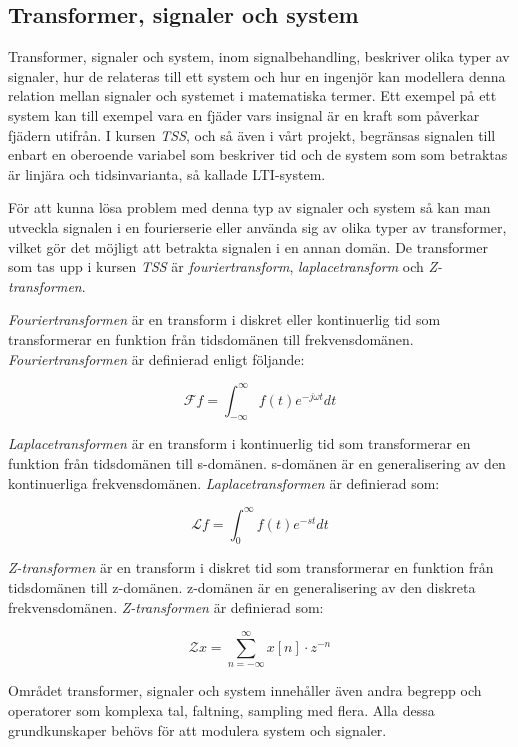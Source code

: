 \documentclass[]{article}
\begin{document}
\subsection{Transformer, signaler och system}
Transformer, signaler och system, inom signalbehandling, beskriver olika typer av signaler, hur de relateras till ett
system och hur en ingenjör kan modellera denna relation mellan signaler och systemet i matematiska termer. Ett exempel
på ett system kan till exempel vara en fjäder vars insignal är en kraft som påverkar fjädern utifrån. I kursen
\textit{TSS}, och så även i vårt projekt, begränsas signalen till enbart en oberoende variabel som beskriver tid och de
system som som betraktas är linjära och tidsinvarianta, så kallade  LTI-system.

För att kunna lösa problem med denna typ av signaler och system så kan man utveckla signalen i en fourierserie eller
använda sig av olika typer av transformer, vilket gör det möjligt att betrakta signalen i en annan domän. De transformer
som tas upp i kursen \textit{TSS} är \textit{fouriertransform}, \textit{laplacetransform} och \textit{Z-transformen}.


\textit{Fouriertransformen} är en transform i diskret eller kontinuerlig tid som
transformerar en funktion från tidsdomänen till frekvensdomänen.
\textit{Fouriertransformen} är definierad enligt följande:

\[\mathcal{F} f = \int_{-\infty}^{\infty} f(t) e^{-j \omega t} dt\]

\textit{Laplacetransformen} är en transform i kontinuerlig tid som
transformerar en funktion från tidsdomänen till s-domänen. s-domänen är en
generalisering av den kontinuerliga frekvensdomänen. \textit{Laplacetransformen}
är definierad som:

\[ \mathcal{L} f = \int_{0}^{\infty} f(t)e^{-st} dt \]

\textit{Z-transformen} är en transform i diskret tid som transformerar en
funktion från tidsdomänen till z-domänen. z-domänen är en generalisering av
den diskreta frekvensdomänen. \textit{Z-transformen} är definierad som:

\[\mathcal{Z} x = \sum_{n=-\infty}^{\infty} x[n] \cdot z^{-n}\]

Området transformer, signaler och system innehåller även andra begrepp och
operatorer som komplexa tal, faltning, sampling med flera. Alla dessa
grundkunskaper behövs för att modulera system och signaler.
\end{document}
